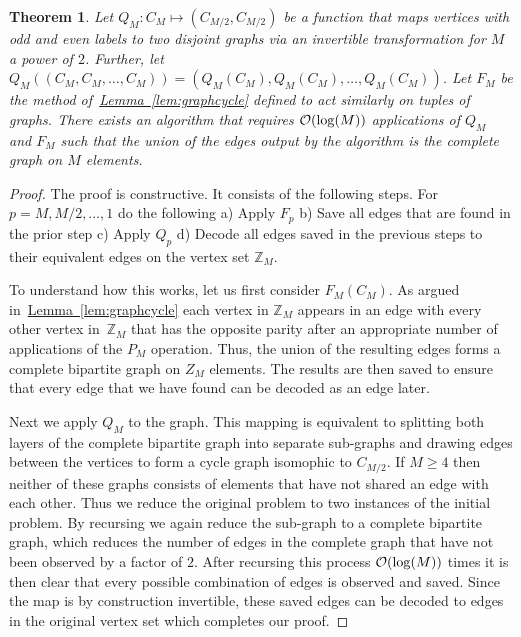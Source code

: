 \documentclass[superscriptaddress,aps,pra,nofootinbib,notitlepage,10pt,longbibliography]{revtex4-1}
\newtheorem{theorem}{Theorem}
\newcommand{\lem}[1]{\hyperref[lem:#1]{Lemma~\ref*{lem:#1}}}
\begin{document}
\begin{theorem}\label{thm:cycle}
Let $Q_M:C_M \mapsto (C_{M/2},C_{M/2})$ be a function that maps vertices with odd and even labels to two disjoint graphs via an invertible transformation for $M$ a power of $2$.  Further, let $Q_M((C_M,C_M,\ldots,C_M)) = (Q_M(C_M),Q_M(C_M),\ldots,Q_M(C_M))$.  Let $F_M$ be the method of~\lem{graphcycle} defined to act similarly on tuples of graphs.  There exists an algorithm that requires ${\cal O}(\log(M))$ applications of $Q_M$ and $F_M$ such that the union of the edges output by the algorithm is the complete graph on $M$ elements.
\end{theorem}
\begin{proof}
The proof is constructive.  It consists of the following steps.  For $p=M,M/2,\ldots,1$ do the following a)
Apply $F_p$ b) Save all edges that are found in the prior step c) Apply $Q_p$ d) Decode all edges saved in the previous steps to their equivalent edges on the vertex set $\mathbb{Z}_{M}$.   

To understand how this works, let us first consider $F_M({C_M})$.  As argued in~\lem{graphcycle} each vertex in $\mathbb{Z}_{M}$ appears in an edge with every other vertex in~$\mathbb{Z}_{M}$ that has the opposite parity after an appropriate number of applications of the $P_M$ operation. Thus, the union of the resulting edges forms a complete bipartite graph on $Z_{M}$ elements. The results are then saved to ensure that every edge that we have found can be decoded as an edge later.

Next we apply $Q_M$ to the graph.  This mapping is equivalent to splitting both layers of the complete bipartite graph into separate sub-graphs and drawing edges between the vertices to form a cycle graph isomophic to $C_{M/2}$.  If $M\ge 4$ then neither of these graphs consists of elements that have not shared an edge with each other.  Thus we reduce the original problem to two instances of the initial problem.  By recursing we again reduce the sub-graph to a complete bipartite graph, which reduces the number of edges in the complete graph that have not been observed by a factor of $2$.  After recursing this process ${\cal O}(\log(M))$ times it is then clear that every possible combination of edges is observed and saved.  Since the map is by construction invertible, these saved edges can be decoded to edges in the original vertex set which completes our proof.
\end{proof}
\end{document}
